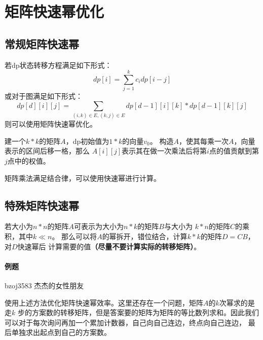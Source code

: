 \section{矩阵快速幂优化}
\subsection{常规矩阵快速幂}
若dp状态转移方程满足如下形式：
\begin{displaymath}
    dp[i]=\sum_{j=1}^k{c_idp[i-j]}
\end{displaymath}
或对于图满足如下形式：
\begin{displaymath}
    dp[d][i][j]=\sum_{(i,k)\in E,(k,j)\in E}{dp[d-1][i][k]*dp[d-1][k][j]}
\end{displaymath}
则可以使用矩阵快速幂优化。

建一个$k*k$的矩阵$A$，dp初始值为$1*k$的向量$v_0$。
构造$A$，使其每乘一次$A$，向量表示的区间后移一格，那么
$A[i][j]$表示其在做一次乘法后将第$i$点的值贡献到第$j$点中的权值。

矩阵乘法满足结合律，可以使用快速幂进行计算。

\subsection{特殊矩阵快速幂}

若大小为$n*n$的矩阵$A$可表示为大小为$n*k$的矩阵$B$与大小为
$k*n$的矩阵$C$的乘积，其中$k\ll n$。
那么可以将$A$的幂拆开，错位结合，计算$k*k$的矩阵$D=CB$，对$D$快速幂后
计算需要的值{\bfseries （尽量不要计算实际的转移矩阵）}。

\paragraph{例题} bzoj3583 杰杰的女性朋友

使用上述方法优化矩阵快速幂效率。这里还存在一个问题，矩阵$A$的$k$次幂求的是走$k$
步的方案数的转移矩阵，但是答案要的矩阵为矩阵的等比数列求和。因此我们
可以对于每次询问再加一个累加计数器，自己向自己连边，终点向自己连边，
最后单独求出起点到自己的方案数。
